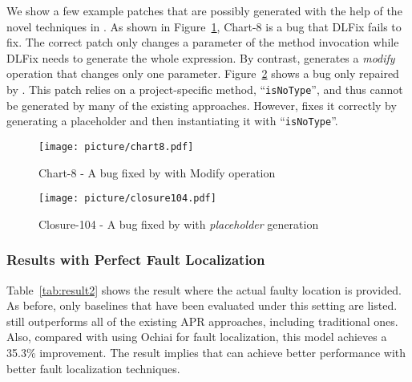 We show a few example patches that are possibly generated with the help of the novel techniques in \techname.
As shown in Figure~\ref{fig:unique2}, Chart-8 is a bug that DLFix fails to fix. The correct patch only changes a parameter of the method invocation while DLFix needs to generate the whole expression. %
By contrast, \techname generates a {\it modify} operation that changes only one parameter.
Figure~\ref{fig:unique} shows a bug only repaired by \techname. This patch relies on a project-specific method, ``\texttt{isNoType}'', and thus cannot be generated by many of the existing approaches. However, \techname  %
fixes it correctly by generating a placeholder and then instantiating it with ``\texttt{isNoType}''. 
\begin{figure}
    \centering
    \texttt{[image: picture/chart8.pdf]}
                            \vspace{-7mm}
    \caption{Chart-8 - A bug fixed by \techname with Modify operation}
    \vspace{-2mm}
    \label{fig:unique2}
\end{figure}
\begin{figure}
  \centering
  \texttt{[image: picture/closure104.pdf]}
                            \vspace{-7mm}      

  \caption{Closure-104 - A bug fixed by \techname with \textit{placeholder} generation}
    \vspace{-2mm}
  \label{fig:unique}
\end{figure}
\vspace{-2mm}
\subsubsection{Results with Perfect Fault Localization}
Table~\ref{tab:result2} shows the result where the actual faulty location is provided. %
As before, only baselines that have been evaluated under this setting are listed.
\techname still outperforms all of the existing APR approaches, including traditional ones. %
Also, compared with \techname using Ochiai for fault localization, this model achieves a 35.3\% improvement. The result implies that \techname can achieve better performance with better fault localization techniques.

